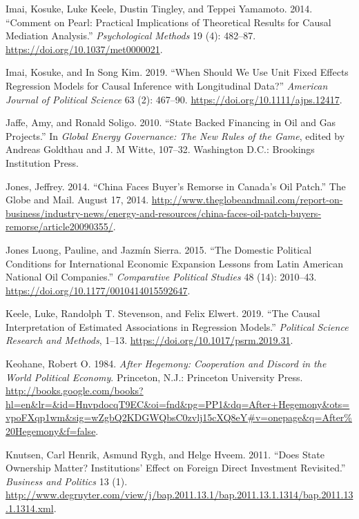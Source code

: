 \documentclass[11pt,]{book}
\begin{document}
\leavevmode\hypertarget{ref-imai_comment_2014-1}{}%
Imai, Kosuke, Luke Keele, Dustin Tingley, and Teppei Yamamoto. 2014. ``Comment on Pearl: Practical Implications of Theoretical Results for Causal Mediation Analysis.'' \emph{Psychological Methods} 19 (4): 482--87. \url{https://doi.org/10.1037/met0000021}.

\leavevmode\hypertarget{ref-imai_when_2019}{}%
Imai, Kosuke, and In Song Kim. 2019. ``When Should We Use Unit Fixed Effects Regression Models for Causal Inference with Longitudinal Data?'' \emph{American Journal of Political Science} 63 (2): 467--90. \url{https://doi.org/10.1111/ajps.12417}.

\leavevmode\hypertarget{ref-jaffe_state_2010}{}%
Jaffe, Amy, and Ronald Soligo. 2010. ``State Backed Financing in Oil and Gas Projects.'' In \emph{Global Energy Governance: The New Rules of the Game}, edited by Andreas Goldthau and J. M Witte, 107--32. Washington D.C.: Brookings Institution Press.

\leavevmode\hypertarget{ref-jones_china_2014}{}%
Jones, Jeffrey. 2014. ``China Faces Buyer's Remorse in Canada's Oil Patch.'' The Globe and Mail. August 17, 2014. \url{http://www.theglobeandmail.com/report-on-business/industry-news/energy-and-resources/china-faces-oil-patch-buyers-remorse/article20090355/}.

\leavevmode\hypertarget{ref-jones_luong_domestic_2015}{}%
Jones Luong, Pauline, and Jazmín Sierra. 2015. ``The Domestic Political Conditions for International Economic Expansion Lessons from Latin American National Oil Companies.'' \emph{Comparative Political Studies} 48 (14): 2010--43. \url{https://doi.org/10.1177/0010414015592647}.

\leavevmode\hypertarget{ref-keele_causal_2019}{}%
Keele, Luke, Randolph T. Stevenson, and Felix Elwert. 2019. ``The Causal Interpretation of Estimated Associations in Regression Models.'' \emph{Political Science Research and Methods}, 1--13. \url{https://doi.org/10.1017/psrm.2019.31}.

\leavevmode\hypertarget{ref-keohane_after_1984}{}%
Keohane, Robert O. 1984. \emph{After Hegemony: Cooperation and Discord in the World Political Economy}. Princeton, N.J.: Princeton University Press. \url{http://books.google.com/books?hl=en\&lr=\&id=HnvpdocqT9EC\&oi=fnd\&pg=PP1\&dq=After+Hegemony\&ots=vpoFXqp1wm\&sig=wZgbQ2KDGWQbsC0zvlj15cXQ8eY\#v=onepage\&q=After\%20Hegemony\&f=false}.

\leavevmode\hypertarget{ref-knutsen_does_2011}{}%
Knutsen, Carl Henrik, Asmund Rygh, and Helge Hveem. 2011. ``Does State Ownership Matter? Institutions' Effect on Foreign Direct Investment Revisited.'' \emph{Business and Politics} 13 (1). \url{http://www.degruyter.com/view/j/bap.2011.13.1/bap.2011.13.1.1314/bap.2011.13.1.1314.xml}.
\end{document}
